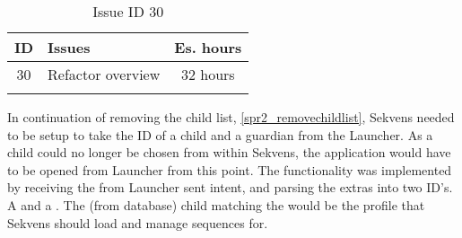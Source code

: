 \begin{longtable} { | c | p{12cm} | c | } 
\hline
	ID 	&	Issues	&		 Es. hours \\\hline
	30 	&	Refactor overview	&	32 hours \\\hline
\caption{Issue ID 30}
\label{tab:spr2_refactoroverview}
\end{longtable}

In continuation of removing the child list, \ref{spr2_removechildlist}, Sekvens needed to be setup to take the ID of a child and a guardian from the Launcher. As a child could no longer be chosen from within Sekvens, the application would have to be opened from Launcher from this point. The functionality was implemented by receiving the from Launcher sent intent, and parsing the extras into two ID's. A  and a . The (from database) child matching the  would be the profile that Sekvens should load and manage sequences for.